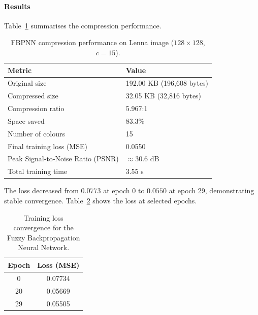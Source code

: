\paragraph{Results}
Table~\ref{tab:fbpnn_performance} summarises the compression performance.

\begin{table}[H]
\centering
\caption{FBPNN compression performance on Lenna image ($128\times128$, $c=15$).}
\label{tab:fbpnn_performance}
\begin{tabularx}{\textwidth}{|l|X|}
\hline
\textbf{Metric} & \textbf{Value} \\
\hline
Original size & 192.00 KB (196,608 bytes) \\
Compressed size & 32.05 KB (32,816 bytes) \\
Compression ratio & 5.967:1 \\
Space saved & 83.3\% \\
Number of colours & 15 \\
Final training loss (MSE) & 0.0550 \\
Peak Signal‑to‑Noise Ratio (PSNR) & $\approx 30.6$ dB \\
Total training time & 3.55 s \\
\hline
\end{tabularx}
\end{table}

The loss decreased from $0.0773$ at epoch 0 to $0.0550$ at epoch 29, demonstrating stable convergence. Table~\ref{tab:fbpnn_convergence} shows the loss at selected epochs.
\begin{table}[H]
\centering
\caption{Training loss convergence for the Fuzzy Backpropagation Neural Network.}
\label{tab:fbpnn_convergence}
\begin{tabular}{|c|c|}
\hline
\textbf{Epoch} & \textbf{Loss (MSE)} \\
\hline
0  & 0.07734 \\
20 & 0.05669 \\
29 & 0.05505 \\
\hline
\end{tabular}
\end{table}





